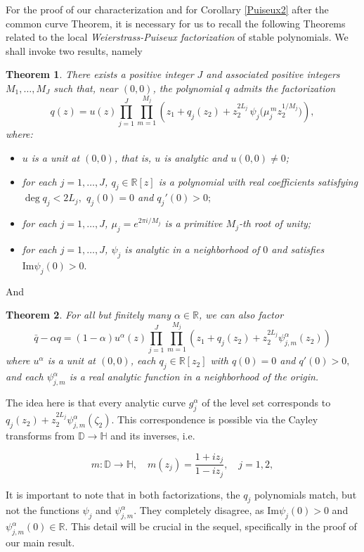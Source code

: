 \documentclass[12pt]{amsart}
\newtheorem{theorem}{Theorem}[section]
\numberwithin{equation}{section}
\begin{document}
For the proof of our characterization and for Corollary \ref{Puiseux2} after the common curve Theorem, it is necessary for us to recall the following Theorems related to the local
\textit{Weierstrass-Puiseux factorization} of stable polynomials. We shall invoke two results, namely

\begin{theorem}\label{Puiseux1} 
There exists a positive integer $J$ and associated positive integers
$M_1,\dots,M_J$ such that, near $(0,0)$, the polynomial $q$ admits the factorization
\begin{equation}\label{eq:theorem52-factorization}
q(z)=u(z)\prod_{j=1}^{J}\prod_{m=1}^{M_j}\left(z_1 + q_j(z_2) + z_2^{2L_j}\,\psi_j\!\bigl(\mu_j^{\,m} z_2^{1/M_j}\bigr)
\right),
\end{equation}
where:
\begin{itemize}
    \item \(u\) is a unit at $(0,0)$, that is, $u$ is analytic and $u(0,0)\neq 0$;
    \item for each $j=1,\dots,J$, $q_j \in \mathbb{R}[z]$ is a polynomial with real coefficients satisfying $\deg q_j < 2L_j,$ $q_j(0)=0$ and $ q_j'(0)>0;$
    \item for each $j=1,\dots,J$, $\mu_j=e^{2\pi i/M_j}$ is a primitive $M_j$-th root of unity;
    \item for each $j=1,\dots,J$, $\psi_j$ is analytic in a neighborhood of $0$ and satisfies
    $\mathrm{Im} \psi_j(0) > 0.$
\end{itemize}
\end{theorem}
And
\begin{theorem}
For all but finitely many $\alpha\in \mathbb{R}$, we can also factor
$$\bar{q}-\alpha q=(1-\alpha)u^{\alpha}(z)\prod_{j=1}^J\prod_{m=1}^{M_j}\left(z_1+q_j(z_2)+z_2^{2L_j}\psi^{\alpha}_{j,m}(z_2)\right)$$
where $u^{\alpha}$ is a unit at $(0,0)$, each $q_j\in \mathbb{R}[z_2]$ with $q(0)=0$ and $q'(0)>0,$ and each $\psi^{\alpha}_{j,m}$ is a real analytic function in a neighborhood of the origin.
\end{theorem}


The idea here is that every analytic curve $g_{j}^{\alpha}$ of the level set corresponds to $q_j(z_2)+z_2^{2L_j}\psi^{\alpha}_{j,m}(\zeta_2).$ This correspondence is possible via the Cayley transforms from $\mathbb{D}\to\mathbb{H}$ and its inverses, i.e.

$$m \colon \mathbb{D}\to \mathbb{H}, \quad m(z_j)=\frac{1+iz_j}{1-iz_j}, \quad j=1,2,$$

It is important to note that in both factorizations, the $q_j$ polynomials match, but not the functions $\psi_j$ and $\psi^{\alpha}_{j,m}.$ They completely disagree, as $\mathrm{Im}\psi_j(0)>0$ and $\psi^{\alpha}_{j,m}(0)\in\mathbb{R}.$ This detail will be crucial in the sequel, specifically in the proof of our main result.
\end{document}
